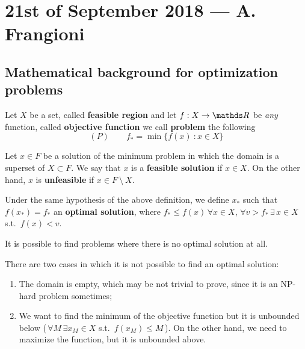\documentclass[computationalMathematics.tex]{subfiles}
\begin{document}
\section{21st of September 2018 --- A. Frangioni}

\subsection{Mathematical background for optimization problems}

\begin{definition}\label{def:min_prob}
  Let $X$ be a set, called \textbf{feasible region} and let $f : X \to \R$ be \emph{any} function, called \textbf{objective function} we call \textbf{problem} the following
\[
  (P) \qquad f_* = \min \{f(x)~:x \in X\}
\]
\end{definition}


\begin{definition}
  Let $x \in F$ be a solution of the minimum problem in which the domain is a superset of $X \subset F$. 
  We say that $x$ is a \textbf{feasible solution} if $x \in X$.
  On the other hand, $x$ is \textbf{unfeasible} if $x \in F~\setminus~X$.
\end{definition}

\begin{definition}
  Under the same hypothesis of the above definition, we define $x_*$ such that $f(x_*) = f_*$ an \textbf{optimal solution}, where $f_* \leq f(x) \, \forall x \in X$, $\forall v > f_* \, \exists \, x \in X$ s.t.~$f(x) < v$.
\end{definition}

It is possible to find problems where there is no optimal solution at all.

\begin{example}
  There are two cases in which it is not possible to find an optimal solution:
  \begin{enumerate}
    \item The domain is empty, which may be not trivial to prove, since it is an NP-hard problem sometimes;
    \item We want to find the minimum of the objective function but it is unbounded below (\,$\forall M \, \exists x_M \in X$
      s.t.~$f(x_M) \leq M$\,).
      On the other hand, we need to maximize the function, but it is unbounded above.
  \end{enumerate}
\end{example}
\end{document}
